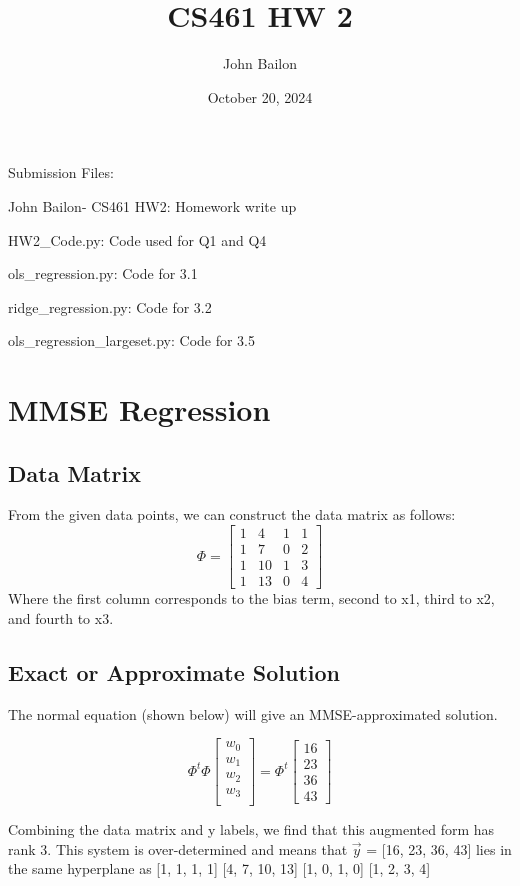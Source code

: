 \documentclass{article}
\title{CS461 HW 2}
\author{John Bailon}
\date{October 20, 2024}
\begin{document}
\maketitle

\noindent
Submission Files:

John Bailon- CS461 HW2: Homework write up

HW2\_Code.py: Code used for Q1 and Q4

ols\_regression.py: Code for 3.1

ridge\_regression.py: Code for 3.2

ols\_regression\_largeset.py: Code for 3.5

\section{MMSE Regression}
\subsection{Data Matrix}
From the given data points, we can construct the data matrix as follows:
\[
\Phi = \begin{bmatrix}
1 & 4 & 1 & 1\\
1 & 7 & 0 & 2\\
1 & 10 & 1 & 3\\
1 & 13 & 0 & 4
\end{bmatrix}
\]
\noindent
Where the first column corresponds to the bias term, second to x1, third to x2, and fourth to x3.

\subsection{Exact or Approximate Solution}

The normal equation (shown below) will give an MMSE-approximated solution.

\[
\Phi^t \Phi \begin{bmatrix}
w_0\\
w_1\\
w_2\\
w_3\\
\end{bmatrix} = \Phi^t \begin{bmatrix}
16\\
23\\
36\\
43
\end{bmatrix} 
\]

\noindent
Combining the data matrix and y labels, we find that this augmented form has rank 3. This system is over-determined and means that $\Vec{y}$ = [16, 23, 36, 43] lies in the same hyperplane as [1, 1, 1, 1] [4, 7, 10, 13] [1, 0, 1, 0] [1, 2, 3, 4]
\end{document}
